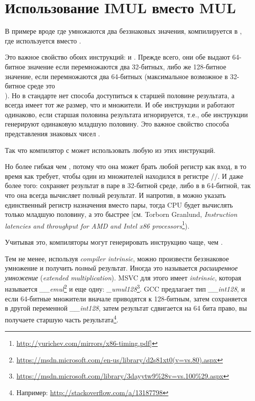 \section{Использование IMUL вместо MUL}
\label{IMUL_over_MUL}

В примере вроде  где умножаются два беззнаковых значения, компилируется в
, где используется \IMUL вместо \MUL.

Это важное свойство обоих инструкций: \MUL и \IMUL{}.
Прежде всего, они обе выдают 64-битное значение если перемножаются два 32-битных, либо же 128-битное значение,
если перемножаются два 64-битных (максимальное возможное  в 32-битное среде это \\
).
Но в стандарте \CCpp нет способа доступиться к старшей половине результата, а  всегда имеет
тот же размер, что и множители. %
И обе инструкции \MUL и \IMUL работают одинаково, если старшая половина результата игнорируется, т.е., обе инструкции
генерируют одинаковую младшую половину.
Это важное свойство способа представления знаковых чисел .

Так что компилятор с \CCpp может использовать любую из этих инструкций.

Но \IMUL более гибкая чем \MUL, потому что она может брать любой регистр как вход, в то время как \MUL требует,
чтобы один из множителей находился в регистре \AX/\EAX/\RAX.
И даже более того: \MUL сохраняет результат в паре  в 32-битной среде, либо в  в 64-битной,
так что она всегда вычисляет полный результат.
И напротив, в \IMUL можно указать единственный регистр назначения вместо пары, тогда \ac{CPU} будет вычислять только
младшую половину, а это быстрее
[см. Torborn Granlund, \emph{Instruction latencies and throughput for AMD and Intel x86 processors}\footnote{\url{http://yurichev.com/mirrors/x86-timing.pdf}]}).

Учитывая это, компиляторы \CCpp могут генерировать инструкцию \IMUL чаще, чем \MUL.

Тем не менее, используя \emph{compiler intrinsic}, можно произвести беззнаковое умножение и получить \emph{полный} результат.
Иногда это называется \emph{расширенное умножение} (\emph{extended multiplication}).
MSVC для этого имеет \emph{intrinsic}, которая называется \emph{\_\_emul}\footnote{\url{https://msdn.microsoft.com/en-us/library/d2s81xt0(v=vs.80).aspx}} и еще одну: \emph{\_umul128}\footnote{\url{https://msdn.microsoft.com/library/3dayytw9%28v=vs.100%29.aspx}}.
GCC предлагает тип \emph{\_\_int128}, и если 64-битные множители вначале приводятся к 128-битным,
затем  сохраняется в другой переменной \emph{\_\_int128}, затем результат сдвигается на 64 бита
право, вы получаете старшую часть результата\footnote{Например: \url{http://stackoverflow.com/a/13187798}}.

